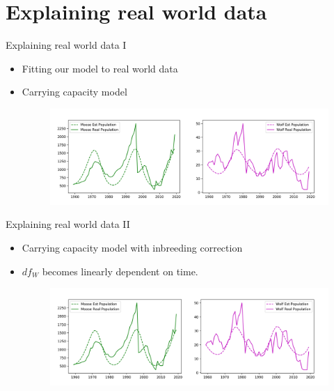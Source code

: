 \documentclass{beamer}
\begin{document}
\section{Explaining real world data}
\begin{frame}{Explaining real world data I}
	\begin{itemize}
		\item Fitting our model to real world data
		\item Carrying capacity model
		\begin{figure}
		\hspace*{-1.2cm}\includegraphics[scale=0.4]{../plot_notebooks/est_cap}
		\end{figure}
	\end{itemize}
\end{frame}

\begin{frame}{Explaining real world data II}
	\begin{itemize}
		\item Carrying capacity model with inbreeding correction
		\item $df_{W}$ becomes linearly dependent on time.
		\begin{figure}
			\hspace*{-1.2cm}\includegraphics[scale=0.4]{../plot_notebooks/est_cap_sick}
		\end{figure}
	\end{itemize}
\end{frame}
\end{document}
